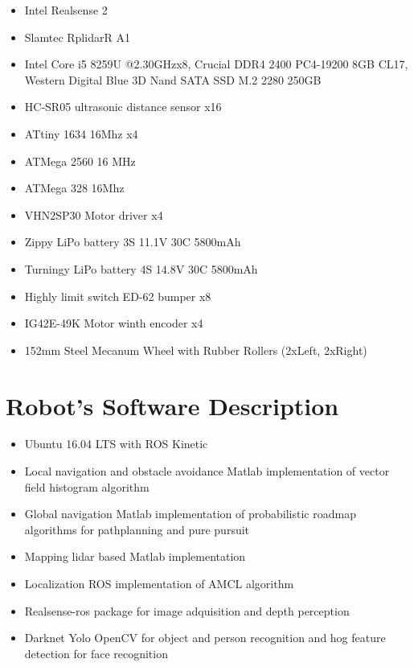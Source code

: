 \begin{itemize}[nosep]
	\item Intel Realsense 2
  \item Slamtec RplidarR A1 
  \item Intel Core i5 8259U @2.30GHzx8, Crucial DDR4 2400 PC4-19200 8GB CL17, Western Digital Blue 3D Nand SATA SSD M.2 2280 250GB
  \item HC-SR05 ultrasonic distance sensor x16
  \item ATtiny 1634 16Mhz x4
  \item ATMega 2560 16 MHz
  \item ATMega 328 16Mhz
  \item VHN2SP30 Motor driver x4
  \item Zippy LiPo battery 3S 11.1V 30C 5800mAh 
  \item Turningy LiPo battery 4S 14.8V 30C 5800mAh 
  \item Highly limit switch ED-62 bumper x8
  \item IG42E-49K Motor winth encoder x4
  \item 152mm Steel Mecanum Wheel with Rubber Rollers (2xLeft, 2xRight)


\end{itemize}

\section*{Robot's Software Description}

\begin{itemize}[nosep]
	\item Ubuntu 16.04 LTS with ROS Kinetic
  \item Local navigation and obstacle avoidance Matlab implementation of vector field histogram algorithm
  \item Global navigation Matlab implementation of probabilistic roadmap algorithms for pathplanning and pure pursuit
  \item Mapping lidar based Matlab implementation
  \item Localization ROS implementation of AMCL algorithm
  \item Realsense-ros package for image adquisition and depth perception
  \item Darknet Yolo OpenCV for object and person recognition and hog feature detection for face recognition
\end{itemize}


